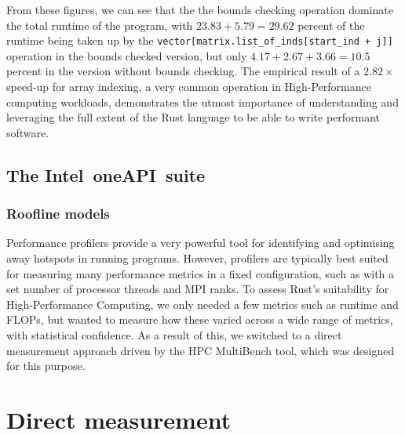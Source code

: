 From these figures, we can see that the the bounds checking operation dominate the total runtime of the program, with $23.83 + 5.79 = 29.62$ percent of the runtime being taken up by the \texttt{vector[matrix.list_of_inds[start_ind + j]]} operation in the bounds checked version, but only $4.17 + 2.67 + 3.66 = 10.5$ percent in the version without bounds checking. The empirical result of a $2.82\times$ speed-up for array indexing, a very common operation in High-Performance computing workloads, demonstrates the utmost importance of understanding and leveraging the full extent of the Rust language to be able to write performant software.


\subsection{The Intel\textregistered\ oneAPI\texttrademark\ suite}
\label{ssec:intel-advisor-profiler}

\subsubsection{Roofline models}
\label{sssec:roofline-models}





Performance profilers provide a very powerful tool for identifying and optimising away hotspots in running programs. However, profilers are typically best suited for measuring many performance metrics in a fixed configuration, such as with a set number of processor threads and MPI ranks. To assess Rust's suitability for High-Performance Computing, we only needed a few metrics such as runtime and FLOPs, but wanted to measure how these varied across a wide range of metrics, with statistical confidence. As a result of this, we switched to a direct measurement approach driven by the HPC MultiBench tool, which was designed for this purpose.

\section{Direct measurement}
\label{sec:direct-measurement} %

